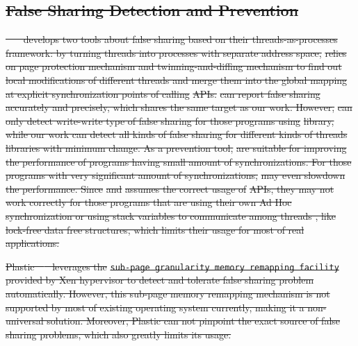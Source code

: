 \documentclass[10pt]{sigplanconf}
\newcommand{\sheriff}{{\scshape Sheriff}}
\newcommand{\SheriffProtect}{\textsc{Sheriff-Protect}}
\newcommand{\SheriffDetect}{\textsc{Sheriff-Detect}}
\newcommand{\pthreads}{\texttt{pthreads}}
\providecommand{\DIFdel}[1]{{\protect\color{red}\sout{#1}}}                      %
\begin{document}
\subsection{\DIFdel{False Sharing Detection and Prevention}}
\addtocounter{subsection}{-1}%
\DIFdel{~\mbox{%
\cite{sheriff}
}%
develops two tools about false sharing based on 
their threads-as-processes framework: by turning threads into processes with separate address space, }%
\DIFdel{relies on page protection mechanism and twinning-and-diffing mechanism 
to find out local modifications of different threads and merge them into the 
global mapping at explicit synchronization points of calling }%
\DIFdel{APIs. 
}%
\DIFdel{can report false sharing accurately and precisely, which shares the same target 
as our work.
However, }%
\DIFdel{can only detect write-write type of false sharing for those programs 
using }%
\DIFdel{library, while our work can detect all kinds of false sharing for different
kinds of threads libraries with minimum change. 
As a prevention tool, }%
\DIFdel{are suitable for improving the performance of
programs having small amount of synchronizations. For those programs with very significant 
amount of synchronizations, }%
\DIFdel{may even slowdown the performance. 
Since }%
\DIFdel{and }%
\DIFdel{assumes the correct usage of }%
\DIFdel{APIs,  
they may not work correctly for those programs that
are using their own Ad Hoc synchronization or using stack variables to communicate among threads
, like lock-free data free structures, which limits their usage for most of real applications.
 }%

\DIFdel{Plastic~\mbox{%
\cite{OSdetection}
}%
leverages the }\texttt{\DIFdel{sub-page granularity memory remapping facility}}
\DIFdel{provided by Xen hypervisor to detect and tolerate false sharing problem automatically.
However, this sub-page memory remapping mechanism is not supported by most of existing operating 
system currently, making it a non-universal solution. Moreover, Plastic can not pinpoint 
the exact source of false sharing problems, which also greatly limits its usage.
}%
\end{document}
